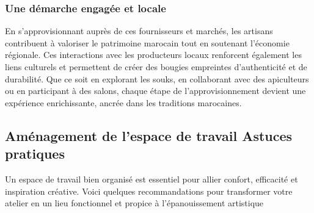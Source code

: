 \documentclass[11pt,fleqn,onecolumn,oneside]{book}
\begin{document}
\subsubsection*{Une démarche engagée et locale}
En s’approvisionnant auprès de ces fournisseurs et marchés, les artisans contribuent à valoriser le patrimoine marocain tout en soutenant l’économie régionale. Ces interactions avec les producteurs locaux renforcent également les liens culturels et permettent de créer des bougies empreintes d’authenticité et de durabilité. Que ce soit en explorant les souks, en collaborant avec des apiculteurs ou en participant à des salons, chaque étape de l’approvisionnement devient une expérience enrichissante, ancrée dans les traditions marocaines.

\subsection*{Aménagement de l’espace de travail Astuces pratiques}

Un espace de travail bien organisé est essentiel pour allier confort, efficacité et inspiration créative. Voici quelques recommandations pour transformer votre atelier en un lieu fonctionnel et propice à l’épanouissement artistique
\end{document}
